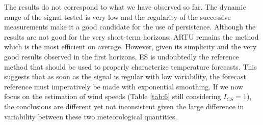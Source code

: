  The results do not correspond to what we have observed so far. The dynamic range of the signal tested is very low and the regularity of the successive measurements make it a good candidate for the use of persistence. Although the results are not good for the very short-term horizons; ARTU remains the method which is the most efficient on average. However, given its simplicity and the very good results observed in the first horizons, ES is undoubtedly the reference method that should be used to properly characterize temperature forecasts. This suggests that as soon as the signal is regular with low variability, the forecast reference must imperatively be made with exponential smoothing. If we now focus on the estimation of wind speeds (Table \ref{tab:6} still considering $I_{CS}=1$), the conclusions are different yet not inconsistent given the large difference in variability between these two meteorological quantities. 

